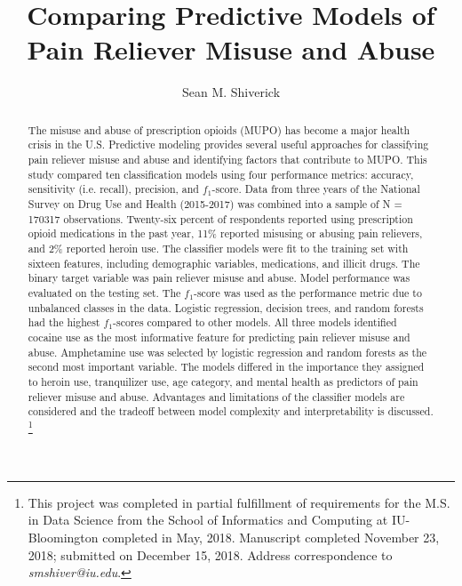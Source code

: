 \documentclass[sigconf]{acmart}
\begin{document}
  \title{Comparing Predictive Models of Pain Reliever Misuse and Abuse}
  \author{Sean M. Shiverick}
\renewcommand{\shortauthors}{S.M. Shiverick}


\begin{abstract}

The misuse and abuse of prescription opioids (MUPO) has become a major 
health crisis in the U.S. Predictive modeling provides several useful
approaches for classifying pain reliever misuse and abuse and identifying
factors that contribute to MUPO. This study compared ten classification 
models using four performance metrics: accuracy, sensitivity (i.e. recall), 
precision, and $f_1$-score. Data from three years of the National Survey 
on Drug Use and Health (2015-2017) was combined into a sample of N = 170317 
observations. Twenty-six percent of respondents reported using prescription 
opioid medications in the past year, 11\% reported misusing or abusing pain 
relievers, and 2\% reported heroin use. The classifier models were fit to the 
training set with sixteen features, including demographic variables, 
medications, and illicit drugs. The binary target variable was pain reliever
misuse and abuse. Model performance was evaluated on the testing set. The
$f_1$-score was used as the performance metric due to unbalanced classes in
the data. Logistic regression, decision trees, and random forests had the 
highest $f_1$-scores compared to other models. All three models identified 
cocaine use as the most informative feature for predicting pain reliever 
misuse and abuse. Amphetamine use was selected by logistic regression and 
random forests as the second most important variable. The models differed in 
the importance they assigned to heroin use, tranquilizer use, age category, 
and mental health as predictors of pain reliever misuse and abuse. 
Advantages and limitations of the classifier models are considered and the tradeoff between model complexity and interpretability is discussed. 
\footnote{This project was completed in partial fulfillment of requirements 
for the M.S. in Data Science from the School of Informatics and Computing at IU-Bloomington completed in May, 2018. Manuscript completed November 23, 2018; submitted on December 15, 2018. Address correspondence to 
\textit{smshiver@iu.edu}.}

\end{abstract}
\maketitle
\end{document}
